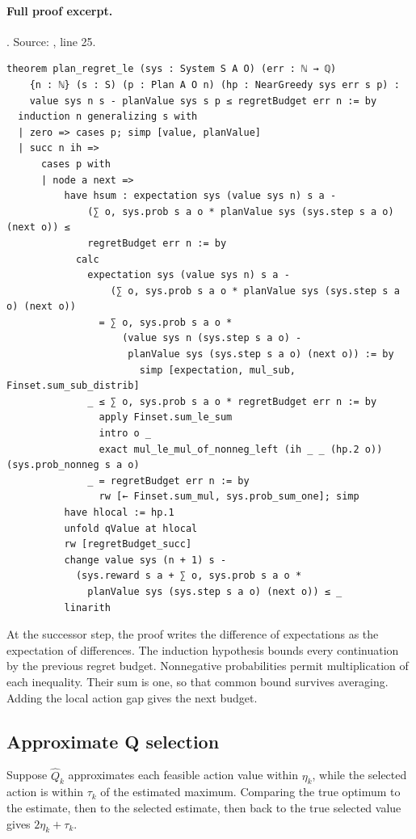 \documentclass[11pt]{article}
\begin{document}
\paragraph{Full proof excerpt.}. Source: , line 25.
\begin{lstlisting}[style=AVOCSource]
theorem plan_regret_le (sys : System S A O) (err : ℕ → ℚ)
    {n : ℕ} (s : S) (p : Plan A O n) (hp : NearGreedy sys err s p) :
    value sys n s - planValue sys s p ≤ regretBudget err n := by
  induction n generalizing s with
  | zero => cases p; simp [value, planValue]
  | succ n ih =>
      cases p with
      | node a next =>
          have hsum : expectation sys (value sys n) s a -
              (∑ o, sys.prob s a o * planValue sys (sys.step s a o) (next o)) ≤
              regretBudget err n := by
            calc
              expectation sys (value sys n) s a -
                  (∑ o, sys.prob s a o * planValue sys (sys.step s a o) (next o))
                = ∑ o, sys.prob s a o *
                    (value sys n (sys.step s a o) -
                     planValue sys (sys.step s a o) (next o)) := by
                       simp [expectation, mul_sub, Finset.sum_sub_distrib]
              _ ≤ ∑ o, sys.prob s a o * regretBudget err n := by
                apply Finset.sum_le_sum
                intro o _
                exact mul_le_mul_of_nonneg_left (ih _ _ (hp.2 o)) (sys.prob_nonneg s a o)
              _ = regretBudget err n := by
                rw [← Finset.sum_mul, sys.prob_sum_one]; simp
          have hlocal := hp.1
          unfold qValue at hlocal
          rw [regretBudget_succ]
          change value sys (n + 1) s -
            (sys.reward s a + ∑ o, sys.prob s a o *
              planValue sys (sys.step s a o) (next o)) ≤ _
          linarith
\end{lstlisting}


At the successor step, the proof writes the difference of expectations as the
expectation of differences. The induction hypothesis bounds every continuation
by the previous regret budget. Nonnegative probabilities permit multiplication
of each inequality. Their sum is one, so that common bound survives averaging.
Adding the local action gap gives the next budget.

\subsection{Approximate Q selection}
Suppose $\widehat Q_k$ approximates each feasible action value within
$\eta_k$, while the selected action is within $\tau_k$ of the estimated
maximum. Comparing the true optimum to the estimate, then to the selected
estimate, then back to the true selected value gives
$2\eta_k+\tau_k$.
\end{document}
